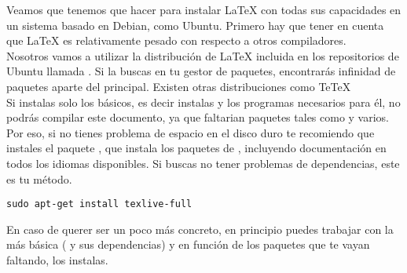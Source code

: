 
Veamos que tenemos que hacer para instalar \LaTeX{} con todas sus
capacidades en un sistema basado en Debian, como Ubuntu.
Primero hay que tener en cuenta que \LaTeX{} es relativamente pesado
con respecto a otros compiladores. \\

Nosotros vamos a utilizar la distribución de \LaTeX{} incluida en los
repositorios de Ubuntu llamada . Si la buscas en
tu gestor de paquetes, encontrarás infinidad de paquetes aparte
del principal. Existen otras distribuciones como Te\TeX\\

Si instalas solo los básicos, es decir instalas  y
los programas necesarios para él, no podrás compilar este documento,
ya que faltarian paquetes tales como  y
varios. Por eso, si no tienes problema de espacio en el disco duro te
recomiendo que instales el paquete , que
instala  los paquetes de , incluyendo
documentación en todos los idiomas disponibles. Si buscas no tener
problemas de dependencias, este es tu método.\\

\begin{lstlisting}[style=consola]
  sudo apt-get install texlive-full
\end{lstlisting}

En caso de querer ser un poco más concreto, en principio puedes
trabajar con la más básica ( y sus dependencias) y
en función de los paquetes que te vayan faltando, los instalas.

